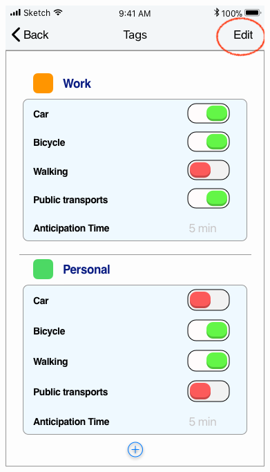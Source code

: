 \begin{figure}[H]
	\centering
	\includegraphics[scale=0.23]{Images/Interface/Tags/5_tags+work+personal-edit}
	\hspace{0.5cm}

\end{figure}
